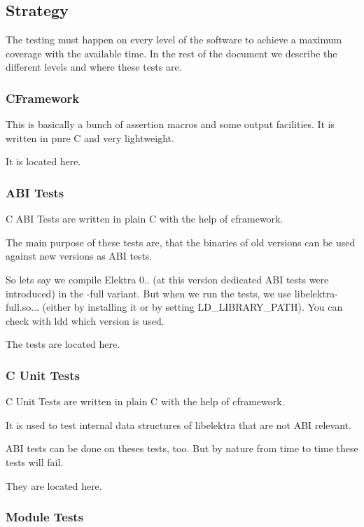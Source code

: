 \subsection*{Strategy}

The testing must happen on every level of the software to achieve a maximum coverage with the available time. In the rest of the document we describe the different levels and where these tests are.

\subsubsection*{C\+Framework}

This is basically a bunch of assertion macros and some output facilities. It is written in pure C and very lightweight.

It is located here.

\subsubsection*{A\+B\+I Tests}

C A\+B\+I Tests are written in plain C with the help of cframework.

The main purpose of these tests are, that the binaries of old versions can be used against new versions as A\+B\+I tests.

So lets say we compile Elektra 0.. (at this version dedicated A\+B\+I tests were introduced) in the -\/full variant. But when we run the tests, we use libelektra-\/full.\+so... (either by installing it or by setting L\+D\+\_\+\+L\+I\+B\+R\+A\+R\+Y\+\_\+\+P\+A\+T\+H). You can check with ldd which version is used.

The tests are located here.

\subsubsection*{C Unit Tests}

C Unit Tests are written in plain C with the help of cframework.

It is used to test internal data structures of libelektra that are not A\+B\+I relevant.

A\+B\+I tests can be done on theses tests, too. But by nature from time to time these tests will fail.

They are located here.

\subsubsection*{Module Tests}

